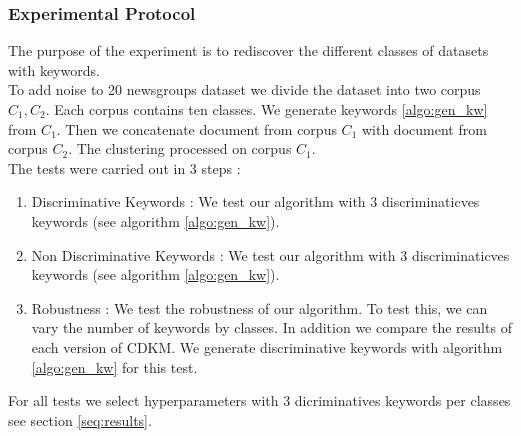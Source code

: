 \subsubsection{\label{seq:results}Experimental Protocol}
The purpose of the experiment is to rediscover the different classes of 
datasets with keywords.
\\To add noise to 20 newsgroups dataset we divide the dataset into two corpus 
$C_1, C_2$. Each corpus contains ten classes. We generate keywords 
\ref{algo:gen_kw} from $C_1$. Then we concatenate document from corpus $C_1$
with document from corpus $C_2$. The clustering processed on corpus $C_1$.
\\The tests were carried out in 3 steps :
\begin{enumerate}
\item Discriminative Keywords : We test our algorithm with 3 discriminaticves 
keywords (see  algorithm \ref{algo:gen_kw}).
\item Non Discriminative Keywords : We test our algorithm with 3 discriminaticves 
keywords (see  algorithm \ref{algo:gen_kw}).
\item Robustness : We test the robustness of our algorithm. To test this, we
can vary the number of keywords by classes. In addition we compare
the results of each version of CDKM. We generate discriminative keywords with 
algorithm \ref{algo:gen_kw} for this test.
\end{enumerate}
For all tests we select hyperparameters with 3 dicriminatives keywords per 
classes see section \ref{seq:results}. 
